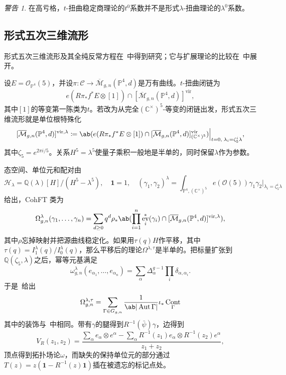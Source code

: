 \documentclass{amsart}
\theoremstyle{definition}
\theoremstyle{remark}
\newtheorem{warn}[thm]{警告}
\theoremstyle{plain}
\theoremstyle{definition}
\theoremstyle{remark}
\newcommand{\C}{\mathbb{C}}
\newcommand{\Q}{\mathbb{Q}}
\renewcommand{\P}{\mathbb{P}}
\newcommand{\Mbar}{\overline{\mathcal{M}}}
\newcommand{\mc}[1]{\mathcal{#1}}
\newcommand{\mr}[1]{\mathrm{#1}}
\newcommand{\1}{\mathbf{1}}
\newcommand{\2}{\mathbf{2}}
\newcommand{\3}{\mathbf{3}}
\newcommand{\vir}{\mr{vir}}
\DeclareMathOperator{\Aut}{Aut}
\DeclareMathOperator{\ev}{ev}
\DeclareMathOperator{\Cont}{Cont}
\begin{document}
\begin{warn}
    在高亏格，\(t\)-扭曲稳定商理论的\(t^0\)系数并不是形式\(\lambda\)-扭曲理论的\(\lambda^0\)系数。
\end{warn}

\subsection{形式五次三维流形}%
\label{sub:The formal quintic}

形式五次三维流形及其全纯反常方程在~\cite{LhoPandharipande2019}中得到研究；它与扩展理论的比较在~\cite{GJRstructure}中展开。

设\(E = \mc{O}_{\P^4}(5)\)，并设\(\pi \colon \mc{C} \to \Mbar_{g,n}(\P^4,d)\)是万有曲线。\(t\)-扭曲闭链为
\[ e(R\pi_* f^* E \otimes [1]) \cap [\Mbar_{g,n}(\P^4,d)]^{\vir}, \]
其中\([1]\)的等变第一陈类为\(t\)。若改为从完全\((\C^{\times})^5\)-等变的闭链出发，形式五次三维流形就是单位根特殊化
\[ [\Mbar_{g,n}(\P^4,d)]^{\vir,\lambda} \coloneqq \ab( e(R\pi_*f^*E \otimes [1]) \cap [\Mbar_{g,n}(\P^4,d)]^{\vir}_{(\C^{\times})^5})\Big|_{t=0, \; \lambda_i = \zeta_5^i \lambda}, \]
其中\(\zeta_5 = e^{2\pi i/5}\)。关系\(H^5 = \lambda^5\)使量子乘积一般地是半单的，同时保留\(\lambda\)作为参数。

态空间、单位元和配对由
\[ \mc{H}_{\lambda} = \Q(\lambda)[H]/(H^5-\lambda^5), \quad \1 = 1, \quad (\gamma_1,\gamma_2)^{\lambda} = \int_{\P^4, (\C^{\times})^5} e(\mc{O}(5))\gamma_1\gamma_2 \Big|_{\lambda_i = \zeta_5^i\lambda} \]
给出，CohFT 类为
\[ \Omega^{\lambda}_{g,n}(\gamma_1, \ldots, \gamma_n) = \sum_{d \geq 0} q^d \rho_* \ab( \prod_{i=1}^n \ev_i^*(\gamma_i) \cap [\Mbar_{g,n}(\P^4,d)]^{\vir,\lambda}), \]
其中\(\rho\)忘掉映射并把源曲线稳定化。如果用\(\tau(q)H\)作平移，其中\(\tau(q) = I^{\lambda}_1(q)/I^{\lambda}_0(q)\)，那么平移后的理论\(\Omega^{\lambda,\tau}\)是半单的。把标量扩张到\(\Q(\zeta_5,\lambda)\)之后，幂等元基满足
\[ \omega^{\lambda}_{g,n}(e_{\alpha_1}, \ldots, e_{\alpha_n}) = \sum_{\alpha}\Delta_{\alpha}^{g-1}\prod_i \delta_{\alpha,\alpha_i}. \]
于是~给出
\[ \Omega^{\lambda,\tau}_{g,n} = \sum_{\Gamma \in G_{g,n}} \frac{1}{\ab|\Aut\Gamma|}\iota_* \Cont_{\Gamma} \]
其中的装饰与~中相同。带有\(\gamma\)的腿得到\(R^{-1}(\bar{\psi})\gamma\)，边得到
\[ V_R(z_1,z_2) = \frac{\sum_{\alpha} e_{\alpha}\otimes e^{\alpha} - \sum_{\alpha} R^{-1}(z_1)e_{\alpha} \otimes R^{-1}(z_2)e^{\alpha}}{z_1+z_2}, \]
顶点得到拓扑场论\(\omega\)，而缺失的保持单位元的部分通过\(T(z) = z(\1 - R^{-1}(z)\1)\)插在被遗忘的标记点处。
\end{document}
